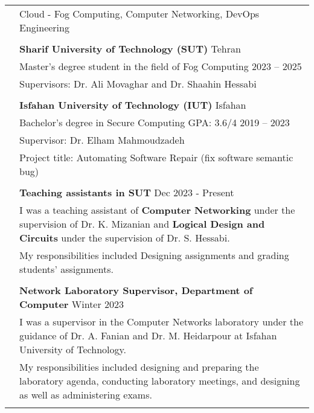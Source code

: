 \documentclass[letterpaper, 11pt]{article}
\begin{document}
\begin{longtable}{p{1.3in}p{4.8in}}


\nohyphens{\color{MidnightBlue}{Research interests}}
& Cloud - Fog Computing, Computer Networking, DevOps Engineering \\
& \\


\color{MidnightBlue}{Education} 
& \textbf{Sharif University of Technology (SUT)} \hfill Tehran \\ 
& Master's degree student in the field of Fog Computing \hfill 2023 -- 2025 \\
& Supervisors: Dr. Ali Movaghar and Dr. Shaahin Hessabi  \\
& \\

& \textbf{Isfahan University of Technology (IUT)} \hfill Isfahan \\ 
& Bachelor's degree in Secure Computing GPA: 3.6/4 \hfill 2019 -- 2023 \\
& Supervisor: Dr. Elham Mahmoudzadeh \\
& Project title: Automating Software Repair (fix software semantic bug) \\
& \\


{\color{MidnightBlue}{Teaching experience}} 
& \textbf{Teaching assistants in SUT} \hfill Dec 2023 - Present \\
& I was a teaching assistant of \textbf{Computer Networking} under the supervision of Dr. K. Mizanian and 
 \textbf{Logical Design and Circuits} under the supervision of Dr. S. Hessabi. \\
& My responsibilities included Designing assignments and grading students' assignments.\\
& \\

& \textbf{Network Laboratory Supervisor, Department of Computer} \hfill Winter 2023 \\
& I was a supervisor in the Computer Networks laboratory under the guidance of Dr. A. Fanian and Dr. M. Heidarpour at Isfahan University of Technology.\\
& My responsibilities included designing and preparing the laboratory agenda, conducting laboratory meetings, and designing as well as administering exams.\\
& \\


\end{longtable}
\end{document}

